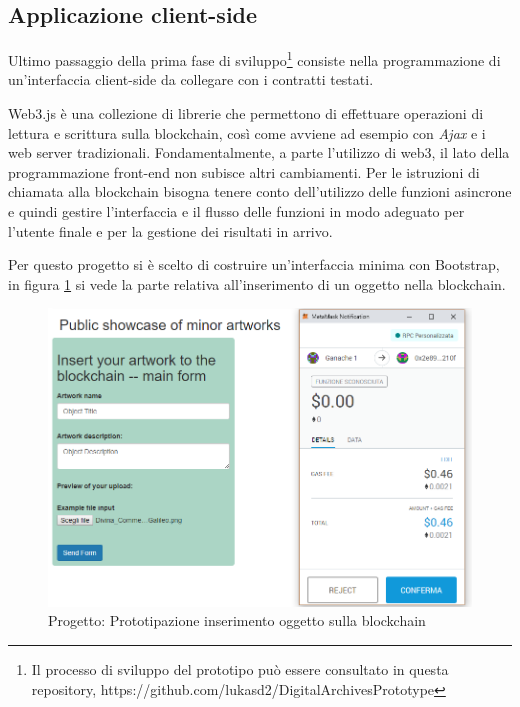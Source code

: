 \subsection{Applicazione client-side}

Ultimo passaggio della prima fase di sviluppo\footnote{Il processo di sviluppo del prototipo può essere consultato in questa repository, https://github.com/lukasd2/DigitalArchivesPrototype} consiste nella programmazione di un'interfaccia client-side da collegare con i contratti testati.

Web3.js è una collezione di librerie che permettono di effettuare operazioni di lettura e scrittura sulla blockchain, così come avviene ad esempio con \emph{Ajax} e i web server tradizionali. Fondamentalmente, a parte l’utilizzo di web3, il lato della programmazione front-end non subisce altri cambiamenti. Per le istruzioni di chiamata alla blockchain bisogna tenere conto dell’utilizzo delle funzioni asincrone e quindi gestire l’interfaccia e il flusso delle funzioni in modo adeguato per l’utente finale e per la gestione dei risultati in arrivo.

Per questo progetto si è scelto di costruire un'interfaccia minima con Bootstrap, in figura \ref{fig:Prototipo} si vede la parte relativa all'inserimento di un oggetto nella blockchain. 

\begin{figure}[H]
\centering
\includegraphics[width=1\textwidth]{immagini/prototype.PNG}
\caption{Progetto: Prototipazione inserimento oggetto sulla blockchain}
\label{fig:Prototipo}
\end{figure}

